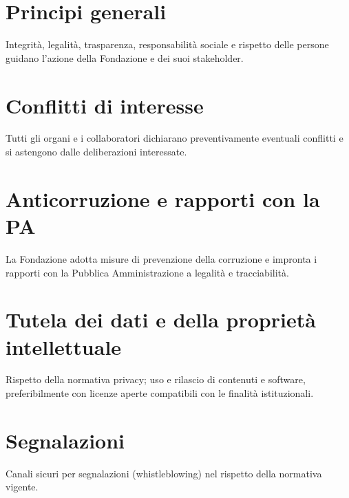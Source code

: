 \maketitle

\begin{center}
\end{center}

\section*{Principi generali}
Integrità, legalità, trasparenza, responsabilità sociale e rispetto delle persone guidano l'azione della Fondazione e dei suoi stakeholder.

\section*{Conflitti di interesse}
Tutti gli organi e i collaboratori dichiarano preventivamente eventuali conflitti e si astengono dalle deliberazioni interessate.

\section*{Anticorruzione e rapporti con la PA}
La Fondazione adotta misure di prevenzione della corruzione e impronta i rapporti con la Pubblica Amministrazione a legalità e tracciabilità.

\section*{Tutela dei dati e della proprietà intellettuale}
Rispetto della normativa privacy; uso e rilascio di contenuti e software, preferibilmente con licenze aperte compatibili con le finalità istituzionali.

\section*{Segnalazioni}
Canali sicuri per segnalazioni (whistleblowing) nel rispetto della normativa vigente.

